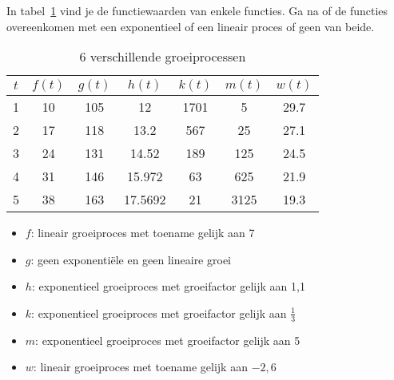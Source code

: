 \begin{oef}    
In tabel~\ref{tbl:6processen} vind je de functiewaarden van enkele functies. 
     Ga na of de functies overeenkomen met een
      exponentieel of een lineair proces of geen van
      beide.
      \begin{table}[htb]
                \centering
                \caption{6 verschillende groeiprocessen}
          \begin{tabular}{ccccccc}
         \toprule
         $t$ & $f(t)$ & $g(t)$ & $h(t)$ & $k(t)$ & $m(t)$ & $w(t)$ \\
         \midrule

         1 & 10 & 105 & 12 & 1701 & 5 & \num{29.7}  \\

         2 & 17 & 118 & \num{13.2} & 567 & 25 & \num{27.1}  \\

         3 & 24 & 131 & \num{14.52} & 189 & 125 & \num{24.5}  \\

         4 & 31 & 146 & \num{15.972} & 63 & 625 & \num{21.9}  \\

         5 & 38 & 163 & \num{17.5692} & 21 & 3125 & \num{19.3}  \\
         \bottomrule

     \end{tabular}
          \label{tbl:6processen}
      \end{table}
      \begin{opl}
      \begin{itemize}
      \item $f$: lineair groeiproces met toename gelijk aan 7
      \item $g$: geen exponentiële en geen lineaire groei
      \item $h$: exponentieel groeiproces met groeifactor gelijk aan 1,1
      \item $k$: exponentieel groeiproces met groeifactor gelijk aan $\frac13$
      \item $m$: exponentieel groeiproces met groeifactor gelijk aan 5
      \item $w$: lineair groeiproces met toename gelijk aan $-2,6$
      \end{itemize}
      \end{opl}
\end{oef}

